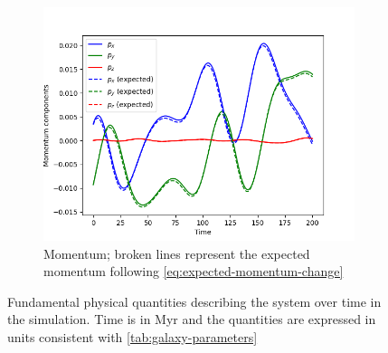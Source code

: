 \begin{figure}[htp]
    \vspace{0.5cm}

    \begin{subfigure}[b]{0.45\textwidth}
        \centering
        \includegraphics[width=\textwidth]{img/p3m/momentum.png}
        \caption{Momentum; broken lines represent the expected momentum following \autoref{eq:expected-momentum-change}}
        \label{fig:physical-quantities-p3m-sub3}
    \end{subfigure}

    \caption{Fundamental physical quantities describing the system over time in the \PThreeM{} simulation.
        Time is in Myr and the quantities are expressed in units consistent with \autoref{tab:galaxy-parameters}}
    \label{fig:physical-quantities-p3m}
\end{figure}